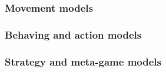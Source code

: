 \documentclass[a4paper,10pt]{article}
\begin{document}
  \subsubsection{Movement models}

  \subsubsection{Behaving and action models}

  \subsubsection{Strategy and meta-game models}
\end{document}
